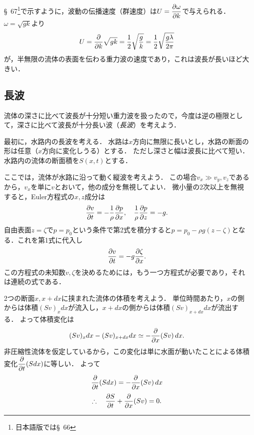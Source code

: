 \S~67\footnote{日本語版では\S~66}で示すように，波動の伝播速度（群速度）は$U=\dpdv{\omega}{k}$で与えられる．
$\omega=\sqrt{gk}$より
\begin{equation}\label{eq12.10:短波の群速度}
    U = \pdv{k}\sqrt{gk} = \frac{1}{2} \sqrt{\frac{g}{k}} = \frac{1}{2} \sqrt{\frac{g\lambda}{2\pi}}
\end{equation}
が，半無限の流体の表面を伝わる重力波の速度であり，これは波長が長いほど大きい．




\subsection*{長波}
流体の深さに比べて波長が十分短い重力波を扱ったので，今度は逆の極限として，深さに比べて波長が十分長い波（\emph{長波}）を考えよう．

最初に，水路内の長波を考える．
水路は$x$方向に無限に長いとし，水路の断面の形は任意（$x$方向に変化しうる）とする．
ただし深さと幅は波長に比べて短い．水路内の流体の断面積を$S(x,t)$とする．

ここでは，流体が水路に沿って動く縦波を考えよう．
この場合$v_x \gg v_y,v_z$であるから，$v_x$を単に$v$とおいて，他の成分を無視してよい．
微小量の2次以上を無視すると，Euler方程式の$x,z$成分は
\[
    \pdv{v}{t} = -\frac{1}{\rho} \pdv{p}{x} , \quad
    \frac{1}{\rho} \pdv{p}{z} = -g.
\]
自由表面$z=\zeta$で$p=p_0$という条件で第2式を積分すると$p=p_0-\rho g(z-\zeta)$となる．これを第1式に代入し
\begin{equation}\label{eq12.11:長波での1D運動方程式}
    \pdv{v}{t} = -g \pdv{\zeta}{x} .
\end{equation}
この方程式の未知数$v,\zeta$を決めるためには，もう一つ方程式が必要であり，それは連続の式である．


2つの断面$x,x+dx$に挟まれた流体の体積を考えよう．
単位時間あたり，$x$の側からは体積$(Sv)_x dx$が流入し，$x+dx$の側からは体積$(Sv)_{x+dx} dx$が流出する．
よって体積変化は
\[
    (Sv)_x dx - (Sv)_{x+dx} dx \simeq -\pdv{x}(Sv)\,dx .
\]
非圧縮性流体を仮定しているから，この変化は単に水面が動いたことによる体積変化$\dpdv{t}(Sdx)$に等しい．
よって
\[
    \pdv{t}(Sdx) = -\pdv{x}(Sv)\,dx
\]
\begin{equation}\label{eq12.12:長波での1D連続の式（using断面積）}
    \therefore\quad \pdv{S}{t} + \pdv{x}(Sv) = 0 .
\end{equation}

